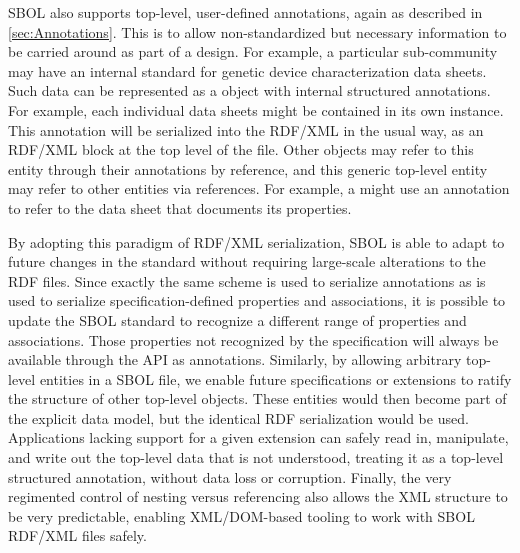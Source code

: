 SBOL also supports top-level, user-defined annotations, again as described in \ref{sec:Annotations}. This is to allow non-standardized but necessary information to be carried around as part of a design. For example, a particular sub-community may have an internal standard for genetic device characterization data sheets. 
Such data can be represented as a  object with internal structured annotations. 
For example, each individual data sheets might be contained in its own  instance.
This annotation will be serialized into the RDF/XML in the usual way, as an RDF/XML block at the top level of the file. 
Other objects may refer to this entity through their annotations by reference, and this generic top-level entity may refer to other entities via references.
For example, a  might use an annotation to refer to the data sheet  that documents its properties.

By adopting this paradigm of RDF/XML serialization, SBOL is able to adapt to future changes in the standard without requiring large-scale alterations to the RDF files. Since exactly the same scheme is used to serialize annotations as is used to serialize specification-defined properties and associations, it is possible to update the SBOL standard to recognize a different range of properties and associations. Those properties not recognized by the specification will always be available through the API as annotations. Similarly, by allowing arbitrary top-level entities in a SBOL file, we enable future specifications or extensions to ratify the structure of other top-level objects. These entities would then become part of the explicit data model, but the identical RDF serialization would be used. Applications lacking support for a given extension can safely read in, manipulate, and write out the top-level data that is not understood, treating it as a top-level structured annotation, without data loss or corruption. Finally, the very regimented control of nesting versus referencing also allows the XML structure to be very predictable, enabling XML/DOM-based tooling to work with SBOL RDF/XML files safely.